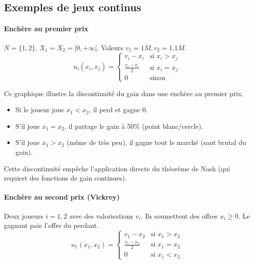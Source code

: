 \subsection{Exemples de jeux continus}

\paragraph{Enchère au premier prix}
$N = \{1, 2\}$, $X_1 = X_2 = [0, +\infty[$. Valeurs $v_1 = 1M, v_2 = 1.1M$.
$$u_i(x_i, x_j) = \begin{cases} v_i - x_i & \text{si } x_i > x_j \\ \frac{v_i - x_i}{2} & \text{si } x_i = x_j \\ 0 & \text{sinon} \end{cases}$$

\begin{center}
\end{center}
\begin{figureexplanation}
Ce graphique illustre la discontinuité du gain dans une enchère au premier prix.
\begin{itemize}
    \item Si le joueur joue $x_1 < x_2$, il perd et gagne 0.
    \item S'il joue $x_1 = x_2$, il partage le gain à 50\% (point blanc/cercle).
    \item S'il joue $x_1 > x_2$ (même de très peu), il gagne tout le marché (saut brutal du gain).
\end{itemize}
Cette discontinuité empêche l'application directe du théorème de Nash (qui requiert des fonctions de gain continues).
\end{figureexplanation}
\paragraph{Enchère au second prix (Vickrey)}
Deux joueurs $i=1,2$ avec des valorisations $v_i$. Ils soumettent des offres $x_i \ge 0$. Le gagnant paie l'offre du perdant.
\[
u_1(x_1, x_2) = 
\begin{cases} 
v_1 - x_2 & \text{si } x_1 > x_2 \\
\frac{v_1 - x_2}{2} & \text{si } x_1 = x_2 \\
0 & \text{si } x_1 < x_2
\end{cases}
\]

